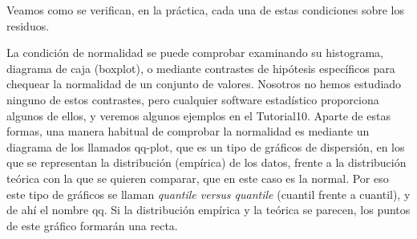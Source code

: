 Veamos como se verifican, en la práctica, cada una de estas condiciones sobre los residuos.

La condición de normalidad se puede comprobar examinando su histograma, diagrama de caja (boxplot), o mediante contrastes de hipótesis específicos para chequear la normalidad de un conjunto de valores. Nosotros no hemos estudiado ninguno de estos contrastes, pero cualquier software estadístico proporciona algunos de ellos, y veremos algunos ejemplos en el Tutorial10. Aparte de estas formas, una manera habitual de comprobar la normalidad es mediante un diagrama de los llamados {\sf qq-plot}, que es un tipo de gráficos de dispersión, en los que se representan la distribución (empírica) de los datos, frente a la distribución teórica con la que se quieren comparar, que en este caso es la normal. Por eso este tipo de gráficos se llaman  {\em quantile versus quantile} (cuantil frente a cuantil), y de ahí el nombre qq. Si la distribución empírica y la teórica se parecen, los puntos de este gráfico formarán una recta.


